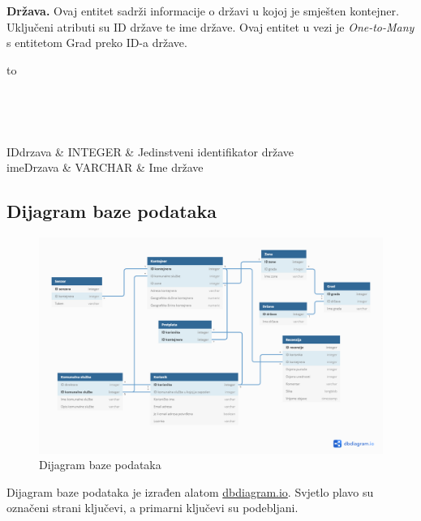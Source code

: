 				\textbf{Država.} Ovaj entitet sadrži informacije o državi u kojoj je smješten kontejner. Uključeni atributi su ID države te ime države. Ovaj entitet u vezi je \textit{One-to-Many} s entitetom Grad preko ID-a države.
				
				\begin{longtabu} to \textwidth {|X[6, l]|X[6, l]|X[20, l]|}
					
					\hline {}\\[3pt] \hline
					\endfirsthead
					
					\hline {}\\[3pt] \hline
					\endhead
					
					\hline 
					\endlastfoot
					
					IDdrzava & INTEGER & Jedinstveni identifikator države\\ \hline
					imeDrzava & VARCHAR & Ime države\\ \hline
					
				\end{longtabu}
			
			
			
			
			\subsection{Dijagram baze podataka}
				\begin{figure}[H]
					\includegraphics[width=1.0\linewidth]{slike/dijagramBaze.png}
					\centering
					\caption{Dijagram baze podataka}
					\label{fig:promjene}
				\end{figure}
			
			Dijagram baze podataka je izrađen alatom \href{https://dbdiagram.io}{dbdiagram.io}. Svjetlo plavo su označeni strani ključevi, a primarni ključevi su podebljani. 
			
